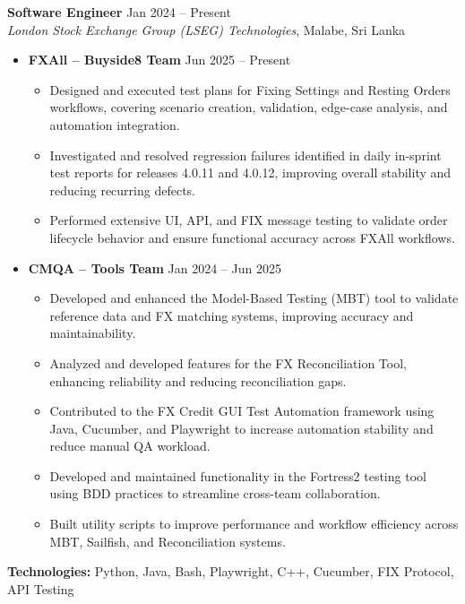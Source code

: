 \documentclass[letterpaper,11pt]{article}
\begin{document}
  \item
  \textbf{Software Engineer} \hfill Jan 2024 -- Present \\
  \textit{London Stock Exchange Group (LSEG) Technologies}, Malabe, Sri Lanka
  \begin{itemize}[leftmargin=*, topsep=2pt]
    \item \textbf{FXAll -- Buyside8 Team} \hfill Jun 2025 -- Present
    \begin{itemize}[leftmargin=*]
        \item Designed and executed test plans for Fixing Settings and Resting Orders workflows, covering scenario creation, validation, edge-case analysis, and automation integration.
        \item Investigated and resolved regression failures identified in daily in-sprint test reports for releases 4.0.11 and 4.0.12, improving overall stability and reducing recurring defects.
        \item Performed extensive UI, API, and FIX message testing to validate order lifecycle behavior and ensure functional accuracy across FXAll workflows.
    \end{itemize}

    \item \textbf{CMQA -- Tools Team} \hfill Jan 2024 -- Jun 2025
    \begin{itemize}[leftmargin=*]
        \item Developed and enhanced the Model-Based Testing (MBT) tool to validate reference data and FX matching systems, improving accuracy and maintainability.
        \item Analyzed and developed features for the FX Reconciliation Tool, enhancing reliability and reducing reconciliation gaps.
        \item Contributed to the FX Credit GUI Test Automation framework using Java, Cucumber, and Playwright to increase automation stability and reduce manual QA workload.
        \item Developed and maintained functionality in the Fortress2 testing tool using BDD practices to streamline cross-team collaboration.
        \item Built utility scripts to improve performance and workflow efficiency across MBT, Sailfish, and Reconciliation systems.
    \end{itemize}
  \end{itemize}
  \small{\textbf{Technologies:} Python, Java, Bash, Playwright, C++, Cucumber, FIX Protocol, API Testing}
\end{document}
